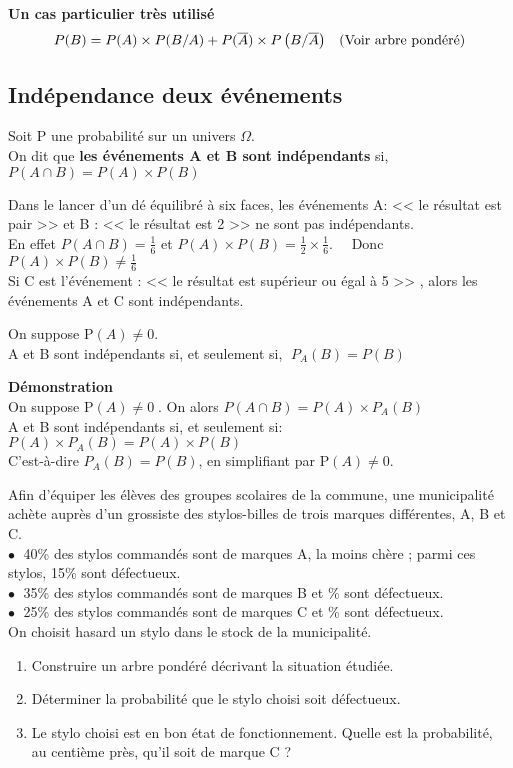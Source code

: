   \textbf{Un cas particulier très utilisé} $$  P(B) = P(A) \times P(B/A)+P(\overline{A}) \times P\left(B/\overline{A}\right) \; \;\;\text{(Voir arbre pondéré)}$$
  
  \subsection{Indépendance deux événements}
 \begin{definition}
Soit P une probabilité sur un univers $ \Omega $.\\
On dit que \textbf {les événements A et B sont indépendants} si,\quad 
$ P(A\cap B)= P(A)\times  P(B)$
 \end{definition}
\begin{example}
Dans le lancer d'un dé équilibré à six faces, les événements A: << le résultat est pair >>  et  B : << le résultat est 2 >>   ne sont pas indépendants.\\ En effet $ P(A\cap B)=\frac{1}{6} $\; et \; $P(A)\times  P(B)= \frac{1}{2}\times\frac{1}{6}. \quad$  Donc  $P(A)\times  P(B)\neq \frac{1}{6} $\\
Si C est l'événement : << le résultat est supérieur ou égal à 5 >> , alors les événements A et C sont indépendants.\\
\end{example}
\begin{property}
On suppose  P$ (A)\neq 0 $.\\
 A et B sont indépendants si, et seulement si, $\;P _{A}(B)=P(B) $
\end{property}
\textbf{Démonstration}\\
On suppose   P$ (A)\neq 0 \;$.  On alors  $ P(A\cap B)= P(A)\times  P_{A}(B)$\\
 A et B sont indépendants si, et seulement si:\quad 
 $ P(A)\times  P_{A}(B)= P(A)\times  P(B)$\\ C'est-à-dire $ P_{A}(B)= P(B)$,\; en simplifiant par \;  P$ (A)\neq 0 $.
\begin{exercice}
  Afin d'équiper les élèves des groupes scolaires de la commune, une municipalité achète auprès d'un grossiste des stylos-billes de trois marques différentes, A, B et C.\\
  $ \bullet \; $  40\%  des stylos commandés sont de marques A,  la moins chère ; parmi ces stylos, 15\% sont défectueux.\\
$ \bullet \; $ 35\%  des stylos commandés sont de marques B et \% sont défectueux.\\
 $ \bullet \; $ 25\%  des stylos commandés sont de marques C et \% sont défectueux.\\ On choisit  hasard  un stylo dans le stock de la  municipalité.
  \begin{enumerate}
  \item Construire un arbre pondéré décrivant la situation étudiée.
  \item Déterminer la probabilité que le stylo choisi soit défectueux.
  \item Le stylo choisi est en bon état de fonctionnement.
  Quelle est la probabilité, au centième près, qu'il soit de marque C ?
 \end{enumerate}
\end{exercice}
